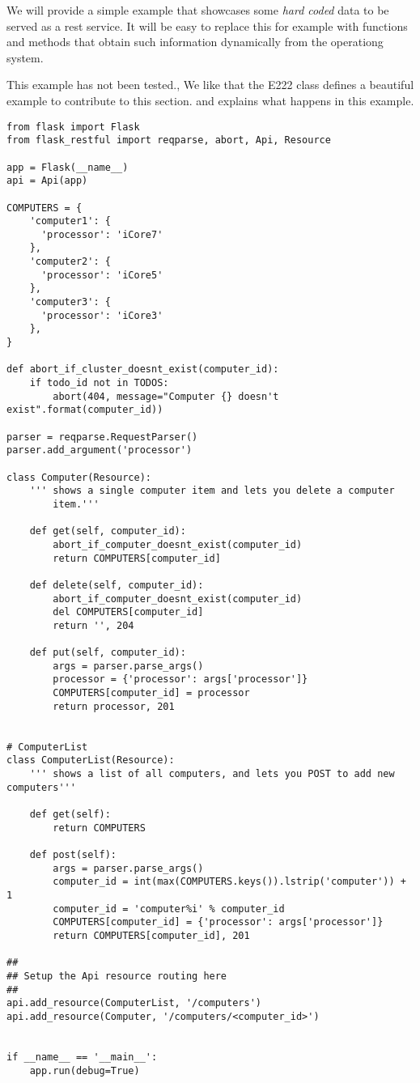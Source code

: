 We will provide a simple example that showcases some {\em hard coded}
data to be served as a rest service. It will be easy to replace this
for example with functions and methods that obtain such information
dynamically from the operationg system. 

\begin{WARNING}
This example has not been tested., We like that the E222 class defines
a beautiful example to contribute to this section. and explains what
happens in this example.
\end{WARNING}


\begin{lstlisting}
from flask import Flask
from flask_restful import reqparse, abort, Api, Resource

app = Flask(__name__)
api = Api(app)

COMPUTERS = {
    'computer1': {
      'processor': 'iCore7'
    },
    'computer2': {
      'processor': 'iCore5'
    },
    'computer3': {
      'processor': 'iCore3'
    },
}

def abort_if_cluster_doesnt_exist(computer_id):
    if todo_id not in TODOS:
        abort(404, message="Computer {} doesn't exist".format(computer_id))

parser = reqparse.RequestParser()
parser.add_argument('processor')

class Computer(Resource):
    ''' shows a single computer item and lets you delete a computer
        item.'''

    def get(self, computer_id):
        abort_if_computer_doesnt_exist(computer_id)
        return COMPUTERS[computer_id]

    def delete(self, computer_id):
        abort_if_computer_doesnt_exist(computer_id)
        del COMPUTERS[computer_id]
        return '', 204

    def put(self, computer_id):
        args = parser.parse_args()
        processor = {'processor': args['processor']}
        COMPUTERS[computer_id] = processor
        return processor, 201


# ComputerList
class ComputerList(Resource):
    ''' shows a list of all computers, and lets you POST to add new computers'''

    def get(self):
        return COMPUTERS

    def post(self):
        args = parser.parse_args()
        computer_id = int(max(COMPUTERS.keys()).lstrip('computer')) + 1
        computer_id = 'computer%i' % computer_id
        COMPUTERS[computer_id] = {'processor': args['processor']}
        return COMPUTERS[computer_id], 201

##
## Setup the Api resource routing here
##
api.add_resource(ComputerList, '/computers')
api.add_resource(Computer, '/computers/<computer_id>')


if __name__ == '__main__':
    app.run(debug=True)
\end{lstlisting}



